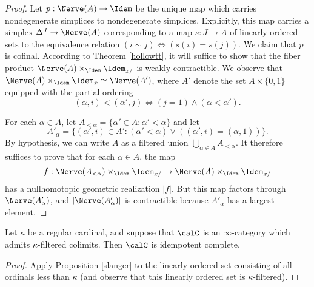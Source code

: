 \begin{proof}
Let $p: \Nerve(A) \rightarrow \Idem$ be the unique map which carries nondegenerate simplices to nondegenerate simplices. Explicitly, this map carries a simplex $\Delta^{J} \rightarrow \Nerve(A)$ corresponding to a map $s: J \rightarrow A$ of linearly ordered sets to the equivalence relation
$( i \sim j) \Leftrightarrow ( s(i) = s(j) )$. We claim that $p$ is cofinal. According to Theorem \ref{hollowtt}, it will suffice to show that the fiber product $\Nerve(A) \times_{\Idem} \Idem_{x/}$ is weakly contractible. We observe that $\Nerve(A) \times_{ \Idem} \Idem_{x} \simeq \Nerve(A')$, where
$A'$ denote the set $A \times \{0,1\}$ equipped with the partial ordering
$$ (\alpha, i) < (\alpha', j) \Leftrightarrow ( j = 1) \wedge ( \alpha < \alpha' ).$$

For each $\alpha \in A$, let $A_{< \alpha} = \{ \alpha' \in A: \alpha' < \alpha \}$ and let
$$A'_{\alpha} = \{ (\alpha',i) \in A' : (\alpha' < \alpha) \vee ( (\alpha',i) = (\alpha,1) ) \}.$$
By hypothesis, we can write
$A$ as a filtered union $\bigcup_{\alpha \in A} A_{< \alpha}$. It therefore suffices to prove
that for each $\alpha \in A$, the map
$$f: \Nerve(A_{< \alpha}) \times_{\Idem} \Idem_{x/} \rightarrow \Nerve(A) \times_{\Idem} \Idem_{x/}$$
has a nullhomotopic geometric realization $|f|$. But this map factors through
$\Nerve(A'_{\alpha})$, and $|\Nerve(A'_{\alpha})|$ is contractible because $A'_{\alpha}$ has a largest element.
\end{proof}

\begin{corollary}\label{swwe}
Let $\kappa$ be a regular cardinal, and suppose that $\calC$ is an $\infty$-category which admits $\kappa$-filtered colimits. Then $\calC$ is idempotent complete.
\end{corollary}

\begin{proof}
Apply Proposition \ref{slanger} to the linearly ordered set consisting of all ordinals 
less than $\kappa$ (and observe that this linearly ordered set is $\kappa$-filtered).
\end{proof}
